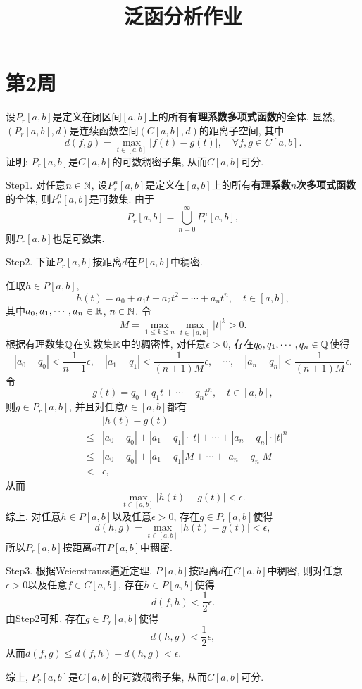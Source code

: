 \documentclass[UTF8,oneside,12pt]{article}  %
\makeatletter
\theoremstyle{DingLi1}
\numberwithin{equation}{section}
\theoremstyle{DingLi2}
\newtheorem{example}{\hskip 2em 问题}[section]
\renewenvironment{proof}[1][\proofname]{\par%
\pushQED{\qed}%
\normalfont \topsep6\p@\@plus6\p@\relax%
\trivlist%
\item[\hskip\labelsep%
#1]\ignorespaces%
}{%
\popQED\endtrivlist\@endpefalse%
}
\renewcommand{\proofname}{\heiti\large\color{blue} 证明}%
\makeatother
\begin{document}
\title{ 泛函分析作业}
\author{}
\date{}
\maketitle

\section{第2周}

\begin{example}
设$P_r[a,b]$是定义在闭区间$[a,b]$上的所有\textbf{有理系数多项式函数}的全体. 显然, $(P_r[a,b],d)$是连续函数空间$(C[a,b],d)$的距离子空间, 其中
   $$d(f,g)=\max_{t\in [a,b]}\left|f(t)-g(t)\right|,\quad \forall f,g\in C[a,b].$$
证明: $P_r[a,b]$是$C[a,b]$的可数稠密子集, 从而$C[a,b]$可分.
\end{example}

\begin{proof}

 Step1. 对任意$n\in \Bbb{N}$, 设$P_r^n[a,b]$是定义在$[a,b]$上的所有\textbf{有理系数$n$次多项式函数}的全体, 则$P_r^n[a,b]$是可数集. 由于
$$P_r[a,b]=\bigcup_{n=0}^\infty P_r^n[a,b],$$
则$P_r[a,b]$也是可数集.

Step2. 下证$P_r[a,b]$按距离$d$在$P[a,b]$中稠密.

    任取$h\in P[a,b]$,
    $$h(t)=a_0+a_1 t+a_2 t^2+\cdots+a_n t^n,\quad t\in[a,b],$$
    其中$a_0,a_1,\cdots,a_n\in \Bbb{R}$, $n\in \Bbb{N}$. 令
    $$M=\max_{1\leq k\leq n}\max_{t\in [a,b]}|t|^k>0.$$
    根据有理数集$\Bbb{Q}$在实数集$\Bbb{R}$中的稠密性, 对任意$\epsilon>0$, 存在$q_0,q_1,\cdots,q_n\in\Bbb{Q}$使得
    $$\left|a_0-q_0\right|<\frac{1}{n+1}\epsilon,\quad \left|a_1-q_1\right|<\frac{1}{(n+1)M}\epsilon,\quad\cdots,\quad\left|a_n-q_n\right|<\frac{1}{(n+1)M}\epsilon.$$
    令
    $$g(t)=q_0+q_1t+\cdots +q_n t^n,\quad t\in [a,b],$$
    则$g\in P_r[a,b]$, 并且对任意$t\in [a,b]$都有
    $$
    \begin{array}{rcl}
    &&|h(t)-g(t)|\\
    &\leq&\left|a_0-q_0\right|+|a_1-q_1|\cdot|t|+\cdots+|a_n-q_n|\cdot |t|^n\\
    &\leq&\left|a_0-q_0\right|+|a_1-q_1|M+\cdots+|a_n-q_n|M\\
    &<&\epsilon,
    \end{array}
    $$
    从而
    $$\max_{t\in[a,b]}|h(t)-g(t)|<\epsilon.$$
    综上, 对任意$h\in P[a,b]$以及任意$\epsilon>0$, 存在$g\in P_r[a,b]$使得
    $$d(h,g)=\max_{t\in [a,b]}|h(t)-g(t)|<\epsilon,$$
    所以$P_r[a,b]$按距离$d$在$P[a,b]$中稠密.

Step3. 根据Weierstrauss逼近定理, $P[a,b]$按距离$d$在$C[a,b]$中稠密, 则对任意$\epsilon>0$以及任意$f\in C[a,b]$, 存在$h\in P[a,b]$使得
$$d(f,h)<\frac12 \epsilon.$$
由Step2可知, 存在$g\in P_r[a,b]$使得
$$d(h,g)<\frac12 \epsilon,$$
从而$d(f,g)\leq d(f,h)+d(h,g)<\epsilon$.

综上, $P_r[a,b]$是$C[a,b]$的可数稠密子集, 从而$C[a,b]$可分.
\end{proof}
\end{document}
